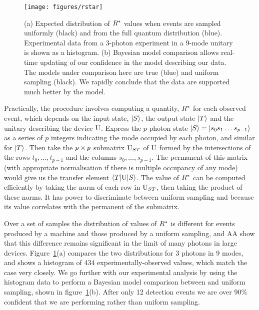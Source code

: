 \begin{figure}[t]
  \centering
  \texttt{[image: figures/rstar]}
  \caption[Using the $\rstar$ discriminator to verify BosonSampling]
  {(a) Expected distribution of \(\rstar\) values when events are sampled
  uniformly (black) and from the full quantum distribution (blue). Experimental
  data from a 3-photon experiment in a 9-mode unitary is shown as a histogram.
  (b) Bayesian model comparison allows real-time updating of our confidence in
  the model describing our data. The models under comparison here are true
  \bosonsampling{} (blue) and uniform sampling (black). We rapidly conclude that
  the data are supported much better by the \bosonsampling{} model.}
  \label{fig:rstar}
\end{figure}
Practically, the procedure involves computing a quantity, \(\rstar\) for each
observed event, which depends on the input state, \(\left|S\right\rangle\), the output state
\(\left|T\right\rangle\) and the unitary describing the device \(\mathrm{U}\). Express the
\(p\)-photon state \(\left|S\right\rangle = \left|s_{0} s_{1} \dots s_{p-1}\right\rangle\) as a series of
\(p\) integers indicating the mode occupied by each photon, and similar for
\(\left|T\right\rangle\). Then take the \(p \times p\) submatrix \(\mathrm{U}_{ST}\) of \(\mathrm{U}\)
formed by the intersections of the rows \(t_{0}, \dots, t_{p-1}\) and the
columns \(s_{0}, \dots, s_{p-1}\). The permanent of this matrix (with
appropriate normalisation if there is multiple occupancy of any mode) would give
us the transfer element \(\left\langle T \middle| \mathrm{U} \middle| S
\right\rangle\). The value of \(\rstar\) can be computed efficiently by taking
the norm of each row in \(\mathrm{U}_{ST}\), then taking the product of these
norms. It has power to discriminate between uniform sampling and
\bosonsampling{} because its value correlates with the permanent of the
submatrix.

Over a set of samples the distribution of values of \(\rstar\) is different for 
events produced by a
\bosonsampling{} machine and those produced by a uniform sampling, and AA show
that this difference remains significant in the limit of many photons in large
devices. Figure~\ref{fig:rstar}(a) compares the two distributions for 3 photons
in 9 modes, and shows a histogram of 434 experimentally-observed values, which
match the \bosonsampling{} case very closely. We go further with our
experimental analysis by using the histogram data to perform a Bayesian model
comparison between \bosonsampling{} and uniform sampling, shown in
figure~\ref{fig:rstar}(b). After only 12 detection events we are over 90\%
confident that we are performing \bosonsampling{} rather than uniform sampling.

